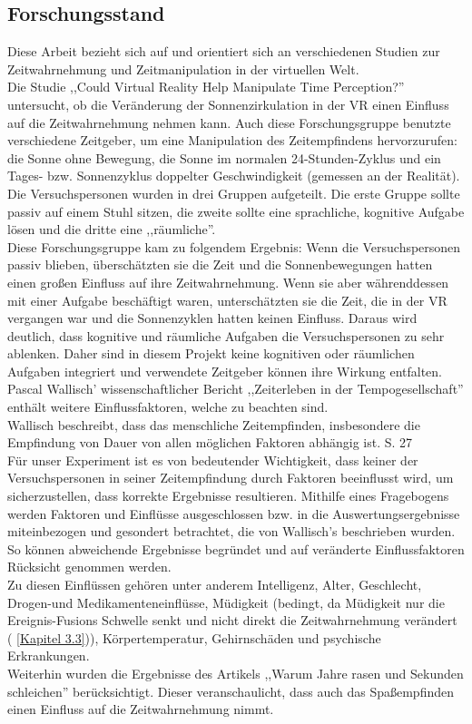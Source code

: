\documentclass{Paper}
\begin{document}
\subsection{Forschungsstand}
Diese Arbeit bezieht sich auf und orientiert sich an verschiedenen Studien zur Zeitwahrnehmung und Zeitmanipulation in der virtuellen Welt. \\
Die Studie ,,Could Virtual Reality Help Manipulate Time Perception?'' untersucht, ob die Veränderung der Sonnenzirkulation in der VR einen Einfluss auf die Zeitwahrnehmung nehmen kann. Auch diese Forschungsgruppe benutzte verschiedene Zeitgeber, um eine Manipulation des Zeitempfindens hervorzurufen: die Sonne ohne Bewegung, die Sonne im normalen 24-Stunden-Zyklus und 
ein Tages- bzw. Sonnenzyklus doppelter Geschwindigkeit (gemessen an der Realität).
 Die Versuchspersonen wurden in drei Gruppen aufgeteilt. Die erste Gruppe sollte passiv auf einem Stuhl sitzen, die zweite sollte eine sprachliche, kognitive Aufgabe lösen und die dritte eine ,,räumliche''.\\
Diese Forschungsgruppe kam zu folgendem Ergebnis: Wenn die Versuchspersonen passiv blieben, überschätzten sie die Zeit und die Sonnenbewegungen hatten einen großen Einfluss auf ihre Zeitwahrnehmung. Wenn sie aber währenddessen mit einer Aufgabe beschäftigt waren, unterschätzten sie die Zeit, die in der VR vergangen war und die Sonnenzyklen hatten keinen Einfluss. \cite{Device&Systems} Daraus wird deutlich, dass kognitive und räumliche Aufgaben die Versuchspersonen zu sehr ablenken. Daher sind in diesem Projekt keine kognitiven oder räumlichen Aufgaben integriert und verwendete Zeitgeber können ihre Wirkung entfalten.\\
Pascal Wallisch' wissenschaftlicher Bericht ,,Zeiterleben in der Tempogesellschaft'' enthält weitere Einflussfaktoren, welche zu beachten sind.  \\
Wallisch beschreibt, \glqq dass das menschliche Zeitempfinden, insbesondere die Empfindung von Dauer von allen möglichen Faktoren abhängig ist\grqq . \cite{Wallish2003} S. 27 \\
Für unser Experiment ist es von bedeutender Wichtigkeit, dass keiner der Versuchspersonen in seiner Zeitempfindung durch Faktoren beeinflusst wird, um sicherzustellen, dass korrekte Ergebnisse resultieren.
Mithilfe eines Fragebogens werden Faktoren und Einflüsse ausgeschlossen bzw. in die Auswertungsergebnisse miteinbezogen und gesondert betrachtet, die von Wallisch’s beschrieben wurden. 
So können abweichende Ergebnisse begründet und auf veränderte Einflussfaktoren Rücksicht genommen werden.\\
Zu diesen Einflüssen gehören unter anderem Intelligenz, Alter, Geschlecht, Drogen-und Medikamenteneinflüsse, Müdigkeit (bedingt, da Müdigkeit nur die Ereignis-Fusions Schwelle senkt und nicht direkt die Zeitwahrnehmung verändert ( \ref {Kapitel 3.3})), Körpertemperatur, Gehirnschäden und psychische Erkrankungen.\\
Weiterhin wurden die Ergebnisse des Artikels ,,Warum Jahre rasen und Sekunden schleichen'' berücksichtigt. Dieser veranschaulicht, dass auch das Spaßempfinden einen Einfluss auf die Zeitwahrnehmung nimmt.\cite{Welt24}
\end{document}
